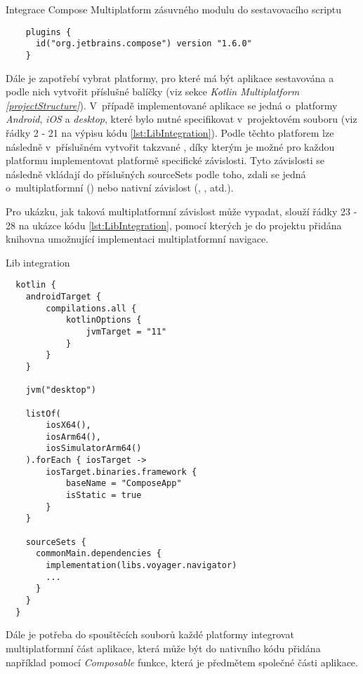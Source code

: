 \begin{listing}[H]
\caption{Integrace Compose Multiplatform zásuvného modulu do sestavovacího scriptu}\label{lst:ComposePlugin}
\begin{verbatim}
    plugins {
      id("org.jetbrains.compose") version "1.6.0"
    }
\end{verbatim}
\end{listing}

Dále je zapotřebí vybrat platformy, pro které má být aplikace sestavována a podle nich vytvořit příslušné balíčky (viz sekce \textit{Kotlin Multiplatform \ref{projectStructure}}).
V~případě implementované aplikace se jedná o~platformy \textit{Android}, \textit{iOS} a \textit{desktop}, které bylo nutné specifikovat v~projektovém 
souboru  (viz řádky 2 - 21 na výpisu kódu \ref{lst:LibIntegration}).
Podle těchto platforem lze následně v~příslušném  vytvořit takzvané , díky kterým je možné
pro každou platformu implementovat platformě specifické závislosti. Tyto závislosti se následně vkládají do příslušných
sourceSets podle toho, zdali se jedná o~multiplatformní () nebo nativní závislost (, , atd.).

Pro ukázku, jak taková multiplatformní závislost může vypadat, slouží řádky 23 - 28 na ukázce kódu \ref{lst:LibIntegration}, pomocí 
kterých je do projektu přidána knihovna umožnující implementaci multiplatformní navigace.

\begin{listing}[H]
\caption{Lib integration}\label{lst:LibIntegration}
\begin{verbatim}
  kotlin {
    androidTarget {
        compilations.all {
            kotlinOptions {
                jvmTarget = "11"
            }
        }
    }

    jvm("desktop")

    listOf(
        iosX64(),
        iosArm64(),
        iosSimulatorArm64()
    ).forEach { iosTarget ->
        iosTarget.binaries.framework {
            baseName = "ComposeApp"
            isStatic = true
        }
    }

    sourceSets {
      commonMain.dependencies {
        implementation(libs.voyager.navigator)
        ...
      }
    }
  }  
\end{verbatim}
\end{listing}

Dále je potřeba do spouštěcích souborů každé platformy integrovat multiplatformní část aplikace, která může být do nativního kódu přidána
například pomocí \textit{Composable} funkce, která je předmětem společné části aplikace.

